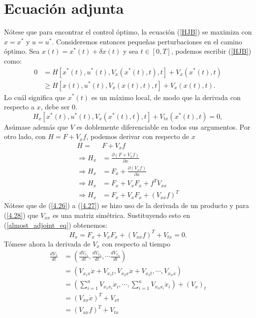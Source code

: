 \section{Ecuación adjunta}
Nótese que para encontrar el control óptimo, la ecuación (\ref{HJB}) se maximiza con $x = x^*$ y $u = u^*$. Consideremos entonces pequeñas perturbaciones en el camino óptimo. Sea $x(t) = x^*(t) + \delta x(t)$ y sea $t\in [0,T]$, podemos escribir (\ref{HJB}) como:
\begin{align}
    0 &= H[x^*(t), u^*(t), V_x(x^*(t), t), t] + V_x(x^*(t),  t) \\
     &\geq H[x(t), u^*(t), V_x(x(t), t), t] + V_x(x(t), t).
\end{align}
Lo cuál significa que $x^*(t)$ es un máximo local, de modo que la derivada con respecto a $x$, debe ser 0.
\begin{equation}
    \label{almost_adjoint_eq}
    H_x[x^*(t), u^*(t), V_x(x^*(t), t), t] + V_{tx}(x^*(t),t) = 0,
\end{equation} 
Asúmase además que $V$ es doblemente diferenciable en todos sus argumentos. Por otro lado, con $H = F+ V_xf$, podemos derivar con respecto de $x$
\begin{align}
    H =& F + V_xf \\
    \Rightarrow H_x &= \frac{\partial(F + V_xf)}{\partial x} \\
    \label{4.26}  \Rightarrow H_x &= F_x + \frac{\partial(V_xf)}{\partial x} \\
    \label{4.27}\Rightarrow H_x &= F_x + V_xF_x  + f^TV_{xx} \\
    \label{4.28}\Rightarrow H_x &= F_x + V_xF_x  + (V_{xx}f)^T 
\end{align}
Nótese que de (\ref{4.26}) a (\ref{4.27}) se hizo uso de la derivada de un producto y para (\ref{4.28}) que $V_{xx}$ es una matriz simétrica. Sustituyendo esto en (\ref{almost_adjoint_eq}) obtenemos:
\begin{equation}
    \label{4.29}
    H_x = F_x + V_xF_x  + (V_{xx}f)^T + V_{tx} = 0.
\end{equation}
Tómese ahora la derivada de $V_x$ con respecto al tiempo
\begin{align}
    \frac{dV_x}{dt} &= \left(\frac{dV_{x_1}}{dt}, \frac{dV_{x_2}}{dt}, \cdots \frac{dV_{x_n}}{dt} \right)  \\
    &= (V_{x_1x}\dot x + V_{x_1t}, V_{x_2x}\dot x + V_{x_2t},  \cdots, V_{x_nx}) \\
    &= (\sum_{i=1}^n V_{x_1x_i} \dot x_i, \cdots, \sum_{i=1}^n V_{x_nx_i} \dot x_i ) + (V_x)_t \\
    & = (V_{xx} \dot x)^T + V_{xt} \\
    \label{4.34} & = (V_{xx}  f)^T + V_{tx} 
\end{align}
